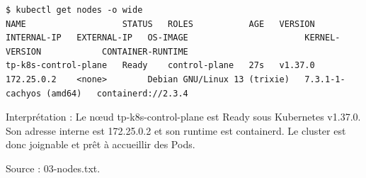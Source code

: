 \documentclass[11pt,a4paper]{article}
\begin{document}
\par\medskip\noindent\begin{minipage}{\linewidth}
\par\vspace{4pt}\noindent\begin{minipage}{\linewidth}
\begin{Verbatim}[breaklines=true,breakanywhere=true,fontsize=\footnotesize,frame=single,framesep=8pt,rulecolor=\color{teal}]
$ kubectl get nodes -o wide
NAME                   STATUS   ROLES           AGE   VERSION   INTERNAL-IP   EXTERNAL-IP   OS-IMAGE                       KERNEL-VERSION            CONTAINER-RUNTIME
tp-k8s-control-plane   Ready    control-plane   27s   v1.37.0   172.25.0.2    <none>        Debian GNU/Linux 13 (trixie)   7.3.1-1-cachyos (amd64)   containerd://2.3.4
\end{Verbatim}
\end{minipage}\par\vspace{6pt}

Interprétation : Le nœud tp-k8s-control-plane est Ready sous Kubernetes v1.37.0. Son adresse interne est 172.25.0.2 et son runtime est containerd. Le cluster est donc joignable et prêt à accueillir des Pods.

{\footnotesize\color{teal} Source : 03-nodes.txt.\par}
\end{minipage}\par\medskip
\end{document}
